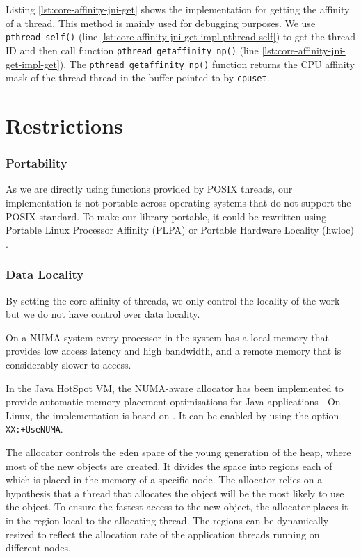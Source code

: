 Listing \ref{lst:core-affinity-jni-get} shows the implementation for
getting the affinity of a thread. This method is mainly used for
debugging purposes. We use \lstinline!pthread_self()! (line
\ref{lst:core-affinity-jni-get-impl-pthread-self}) to get the thread
ID and then call function \lstinline!pthread_getaffinity_np()!  (line
\ref{lst:core-affinity-jni-get-impl-get}). The
\lstinline!pthread_getaffinity_np()! function returns the CPU affinity
mask of the thread thread in the buffer pointed to by
\lstinline!cpuset!.




\section{Restrictions}
\label{sec:appendix-core-affinity-restrictions}

\subsubsection{Portability}

As we are directly using functions provided by POSIX threads, our
implementation is not portable across operating systems that do not
support the POSIX standard. To make our library portable, it could be
rewritten using Portable Linux Processor Affinity (PLPA)
\cite{OpenMPI2010a} or Portable Hardware Locality (hwloc)
\cite{OpenMPI2010}.

\subsubsection{Data Locality}

By setting the core affinity of threads, we only control the locality
of the work but we do not have control over data locality.

On a NUMA system every processor in the system has a local memory that
provides low access latency and high bandwidth, and a remote memory
that is considerably slower to access.

In the Java HotSpot VM, the NUMA-aware allocator has been implemented
to provide automatic memory placement optimisations for Java
applications \cite{Masamitsu2008, Oracle2010, Humble2010}. On Linux,
the implementation is based on \cite{Kleen2004}. It can be enabled by
using the option \verb!-XX:+UseNUMA!.

The allocator controls the eden space of the young generation of the
heap, where most of the new objects are created. It divides the space
into regions each of which is placed in the memory of a specific
node. The allocator relies on a hypothesis that a thread that
allocates the object will be the most likely to use the object. To
ensure the fastest access to the new object, the allocator places it
in the region local to the allocating thread. The regions can be
dynamically resized to reflect the allocation rate of the application
threads running on different nodes.

